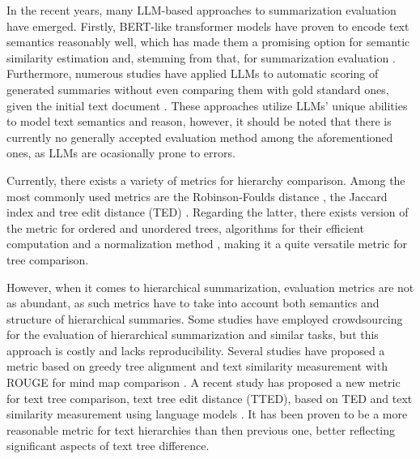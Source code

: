 \documentclass[11pt,a4paper]{article}
\begin{document}
In the recent years, many LLM-based approaches to summarization evaluation have emerged. Firstly, BERT-like transformer models \cite{devlin2019bert, song2020mpnet, cohan2020specter} have proven to encode text semantics reasonably well, which has made them a promising option for semantic similarity estimation \cite{vrbanec2023comparison, chandrasekaran2021evolution} and, stemming from that, for summarization evaluation \cite{zhang2019bertscore, yuan2021bartscore, laban2022summac}. Furthermore, numerous studies have applied LLMs to automatic scoring of generated summaries without even comparing them with gold standard ones, given the initial text document \cite{chang2023booookscore, wang2023shepherd, gao2023human, wu2023large, liu2023g}. These approaches utilize LLMs' unique abilities to model text semantics and reason, however, it should be noted that there is currently no generally accepted evaluation method among the aforementioned ones, as LLMs are ocasionally prone to errors.

Currently, there exists a variety of metrics for hierarchy comparison. Among the most commonly used metrics are the Robinson-Foulds distance \cite{robinson1981comparison}, the Jaccard index\cite{jaccard1901distribution} and tree edit distance (TED) \cite{zhang1989simple}. Regarding the latter, there exists version of the metric for ordered \cite{zhang1989simple} and unordered \cite{zhang1992editing} trees, algorithms for their efficient computation \cite{pawlik2016tree, schwarz2017new} and a normalization method \cite{li2011metric}, making it a quite versatile metric for tree comparison.

However, when it comes to hierarchical summarization, evaluation metrics are not as abundant, as such metrics have to take into account both semantics and structure of hierarchical summaries. Some studies have employed crowdsourcing for the evaluation of hierarchical summarization and similar tasks, but this approach is costly and lacks reproducibility. Several studies have proposed a metric based on greedy tree alignment and text similarity measurement with ROUGE for mind map comparison \cite{wei2019revealing, zhang2024coreference}. A recent study has proposed a new metric for text tree comparison, text tree edit distance (TTED), based on TED and text similarity measurement using language models \cite{sobolevsky2025text}. It has been proven to be a more reasonable metric for text hierarchies than then previous one, better reflecting significant aspects of text tree difference.
\end{document}
